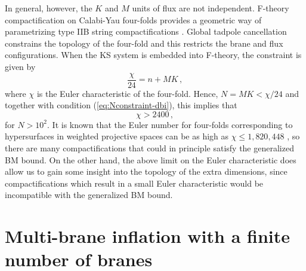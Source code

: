 In general, however, the $K$ and $M$ units of flux are not independent. 
F-theory compactification on Calabi-Yau four-folds
provides a geometric way of parametrizing  
type IIB string compactifications
\cite{witten1,witten2,witten3,sethi,gkp,klemm}. 
Global tadpole cancellation constrains the topology of the four-fold
and this restricts the brane and flux configurations.  
When the KS system is embedded into F-theory, the  
constraint is given by \cite{gkp}
% 
\begin{equation}
\label{eq:Ftheory}
\frac{\chi}{24} = n + MK \,,
\end{equation}
% 
where $\chi$ is the Euler characteristic of the four-fold.  
Hence, $N = MK < \chi /24$ and together with condition 
(\ref{eq:Nconstraint-dbi}), this implies that
% 
\begin{equation}
\label{eq:chilimit}
\chi > 2400 \,,
\end{equation}
% 
for $N > 10^2$.
It is known that the Euler number for four-folds 
corresponding to hypersurfaces in weighted projective spaces
can be as high as $\chi \le 1,820,448$ \cite{klemm},
so there are many compactifications that could 
in principle satisfy the generalized BM bound.
On the other hand, the above limit on the Euler characteristic 
does allow us to gain some insight into the 
topology of the extra dimensions, since compactifications 
which result in a small Euler characteristic would be  
incompatible with the generalized BM bound. 

% 
% 
\section{Multi-brane inflation with a finite number of branes}
\label{sec:finiten-multi}

